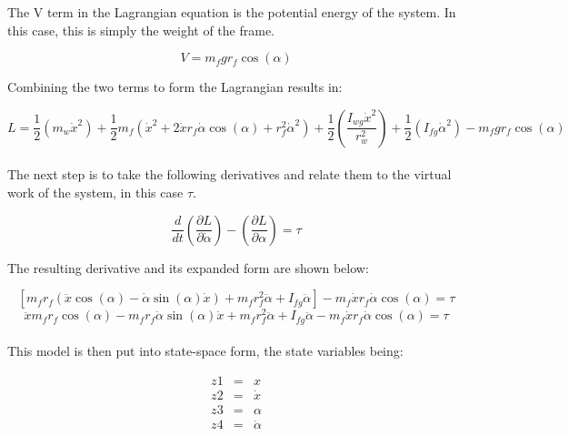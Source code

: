 \documentclass{article}
\begin{document}
The V term in the Lagrangian equation is the potential energy of the system.  In this case, this is simply the weight of the frame.

\begin{equation}
V = m_{f} g r_{f} \cos(\alpha)
\end{equation}

Combining the two terms to form the Lagrangian results in:

 \begin{equation}
 L = \frac{1}{2} (m_{w} \dot{x}^2) + \frac{1}{2} m_{f} (\dot{x}^2 + 2 \dot{x} r_{f} \dot{\alpha} \cos(\alpha)   + r_{f}^2 \dot{\alpha}^2)  + \frac{1}{2} \left(   \frac{I_{wg} \dot{x}^2}     {r_{w}^2  } \right) + \frac{1}{2} (I_{fg} \dot{\alpha}^2 ) - m_{f} g r_{f} \cos(\alpha)
 \end{equation} \\

The next step is to take the following derivatives and relate them to the virtual work of the system, in this case $\tau$.

\begin{equation}
 \frac{d}{dt} \left( \frac{\partial L}{\partial \dot{\alpha}} \right) - \left( \frac{\partial L}{\partial \alpha} \right) = \tau 
 \end{equation}
 
 The resulting derivative and its expanded form are shown below:

\begin{equation}
 \left[ m_{f} r_{f}  ( \ddot{x} \cos(\alpha) - \dot{\alpha} \sin(\alpha) \dot{x}) + m_{f} r_{f}^2 \ddot{\alpha} + I_{fg} \ddot{\alpha} \right] - m_{f} \dot{x} r_{f} \dot{\alpha} \cos(\alpha) = \tau
 \end{equation}
\begin{equation}
 \ddot{x} m_{f} r_{f} \cos(\alpha) - m_{f} r_{f} \dot{\alpha} \sin(\alpha) \dot{x} + m_{f} r_{f}^2 \ddot{\alpha} + I_{fg} \ddot{\alpha} - m_{f} \dot{x} r_{f} \dot{\alpha} \cos(\alpha) = \tau       
\end{equation}\\

This model is then put into state-space form, the state variables being:

\begin{eqnarray}
z1 &=& x \nonumber \\
z2 &=& \dot{x} \nonumber \\
z3 &=& \alpha \nonumber \\
z4 &=& \dot{\alpha} \nonumber \\
\end{eqnarray} \nonumber
\end{document}
